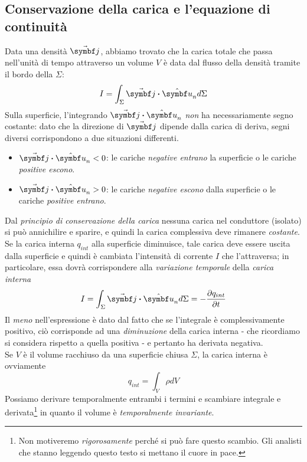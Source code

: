 \subsection{Conservazione della carica e l'equazione di continuità}
Data una densità $\vba{j}$, abbiamo trovato che la carica totale che passa nell'unità di tempo attraverso un volume $V$ è data dal flusso della densità tramite il bordo della $\Sigma$:
\begin{equation*}
	I=\int_{\Sigma}\vba{j}\vdot\vbh{u}_nd\Sigma
\end{equation*}
Sulla superficie, l'integrando $\vba{j}\vdot\vbh{u}_n$ \textit{non} ha necessariamente segno costante: dato che la direzione di $\vba{j}$ dipende dalla carica di deriva, segni diversi corrispondono a due situazioni differenti.
\begin{itemize}
	\item $\vba{j}\vdot\vbh{u}_n<0$: le cariche \textit{negative entrano} la superficie o le cariche \textit{positive escono}.
	\item $\vba{j}\vdot\vbh{u}_n>0$: le cariche \textit{negative escono} dalla superficie o le cariche \textit{positive entrano}.
\end{itemize}
Dal \textit{principio di conservazione della carica} nessuna carica nel conduttore (isolato) si può annichilire e sparire, e quindi la carica complessiva deve rimanere \textit{costante}. Se la carica interna $q_{int}$ alla superficie diminuisce, tale carica deve essere uscita dalla superficie e quindi è cambiata l'intensità di corrente $I$ che l'attraversa; in particolare, essa dovrà corrispondere alla \textit{variazione temporale} della \textit{carica interna}
\begin{equation}
	I=\int_{\Sigma}\vba{j}\vdot\vbh{u}_nd\Sigma=-\pdv{q_{int}}{t}
\end{equation}
Il \textit{meno} nell'espressione è dato dal fatto che se l'integrale è complessivamente positivo, ciò corrisponde ad una \textit{diminuzione} della carica interna - che ricordiamo si considera rispetto a quella positiva - e pertanto ha derivata negativa.\\
Se $V$ è il volume racchiuso da una superficie chiusa $\Sigma$, la carica interna è ovviamente
\begin{equation*}
	q_{int}=\int_V\rho dV
\end{equation*}
Possiamo derivare temporalmente entrambi i termini e scambiare integrale e derivata\footnote{Non motiveremo \textit{rigorosamente} perché si può fare questo scambio. Gli analisti che stanno leggendo questo testo si mettano il cuore in pace.} in quanto il volume è \textit{temporalmente invariante}.
